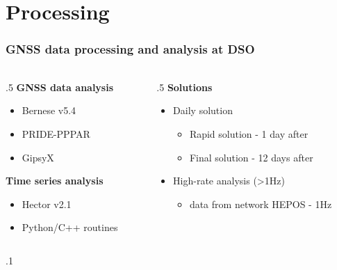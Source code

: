 \section{Processing}

\begin{frame}
  \frametitle{GNSS data processing and analysis at DSO}
  \framesubtitle{}
  \label{}
  \begin{columns}[T]
    \begin{column}{.5\textwidth}
    \textbf{GNSS data analysis}
      \begin{itemize}\setlength\itemsep{1em}
         \item Bernese v5.4 \citep{bernese_2015}
         \item PRIDE-PPPAR \citep{geng_pride_2019}
         \item GipsyX \citep{bertiger_gipsyxrtgx_2020}
       \end{itemize} 
    \textbf{Time series analysis}
    \begin{itemize}\setlength\itemsep{1em}
      \item Hector v2.1 \citep{Bos2012}
      \item Python/C++ routines
    \end{itemize}
    \end{column}
    \begin{column}{.5\textwidth}
      \textbf{Solutions}
      \begin{itemize}\setlength\itemsep{1em}
        \item Daily solution
          \begin{itemize}\setlength\itemsep{1em}
            \item Rapid solution - 1 day after
            \item Final solution - 12 days after
          \end{itemize}
        \item High-rate analysis (>1Hz)
          \begin{itemize}\setlength\itemsep{1em}
            \item data from network HEPOS - 1Hz
          \end{itemize}
      \end{itemize}
    \end{column}
  \end{columns}
  \begin{columns}[T]
    \begin{column}{.1\textwidth}

\end{column}
\end{columns}
\end{frame}

